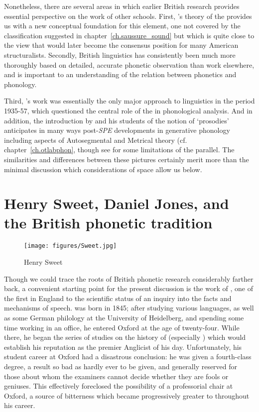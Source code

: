 Nonetheless, there are several areas in which earlier British research
provides essential perspective on the work of other schools. First,
's theory of the  provides us with a new conceptual
foundation for this element, one not covered by the classification
suggested in chapter~\ref{ch.saussure_sound} but which is quite close
to the view that would later become the consensus position for many
American structuralists. Secondly, British linguistics has
consistently been much more thoroughly based on detailed, accurate
phonetic observation than work elsewhere, and is important to an
understanding of the relation between phonetics and phonology.

Third, {\Firth}'s work was essentially the only major approach to
linguistics in the period 1935-57, which questioned the central role
of the  in phonological analysis. And in addition, the
introduction by {\Firth} and his students of the notion of `prosodies'
anticipates in many ways post-\textsl{SPE} developments in generative
phonology including aspects of Autosegmental and Metrical theory
(cf. chapter~\ref{ch.otlabphon}, though see
\citet{ogden.local94:misrepresentation} for some limitations of the
parallel. The similarities and differences between these pictures
certainly merit more than the minimal discussion which considerations
of space allow us below.

\section{Henry Sweet, Daniel Jones, and the British phonetic tradition}

\begin{wrapfigure}{r}{.4\textwidth}
  \texttt{[image: figures/Sweet.jpg]}
  \caption{Henry Sweet}
  \label{fig:ch.firth.sweet}
\end{wrapfigure}
Though we could trace the roots of British phonetic research
considerably farther back, a convenient starting point for the present
discussion is the work of , one of the first in England to
 the scientific status of an inquiry into the facts and
mechanisms of speech. {\Sweet} was born in 1845; after studying various
languages, as well as some {German} philology at the University of
Heidelberg, and spending some time working in an office, he entered
Oxford at the age of twenty-four. While there, he began the series of
studies on the history of  (especially ) which would
establish his reputation as the premier Anglicist of his
day. Unfortunately, his student career at Oxford had a disastrous
conclusion: he was given a fourth-class degree, a result so bad as
hardly ever to be given, and generally reserved for those about whom
the examiners cannot decide whether they are fools or geniuses. This
effectively foreclosed the possibility of a professorial chair at
Oxford, a source of bitterness which became progressively greater to
{\Sweet} throughout his career.

